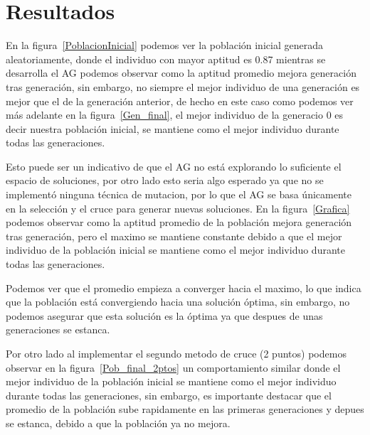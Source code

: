 \section{Resultados}

En la figura~\ref{PoblacionInicial} podemos ver la población inicial generada aleatoriamente, donde el individuo con mayor aptitud es 0.87 
mientras se desarrolla el AG podemos observar como la aptitud promedio mejora generación tras generación, sin embargo, no siempre el mejor 
individuo de una generación es mejor que el de la generación anterior, de hecho en este caso como podemos ver más adelante en la figura~\ref{Gen_final},
el mejor individuo de la generacio 0 es decir nuestra población inicial, se mantiene como el mejor individuo durante todas las generaciones.

Esto puede ser un indicativo de que el AG no está explorando lo suficiente el espacio de soluciones, por otro lado esto seria algo esperado ya que
no se implementó ninguna técnica de mutacion, por lo que el AG se basa únicamente en la selección y el cruce para generar nuevas soluciones.
En la figura~\ref{Grafica} podemos observar como la aptitud promedio de la población mejora generación tras generación, pero el maximo se mantiene constante
debido a que el mejor individuo de la población inicial se mantiene como el mejor individuo durante todas las generaciones.

Podemos ver que el promedio empieza a converger hacia el maximo, lo que indica que la población está convergiendo hacia una solución óptima, sin embargo, no
podemos asegurar que esta solución es la óptima ya que despues de unas generaciones se estanca.

Por otro lado al implementar el segundo metodo de cruce (2 puntos) podemos observar en la figura~\ref{Pob_final_2ptos} un comportamiento similar donde el mejor
individuo de la población inicial se mantiene como el mejor individuo durante todas las generaciones, sin embargo, es importante destacar que el promedio de la población
sube rapidamente en las primeras generaciones y depues se estanca, debido a que la población ya no mejora.